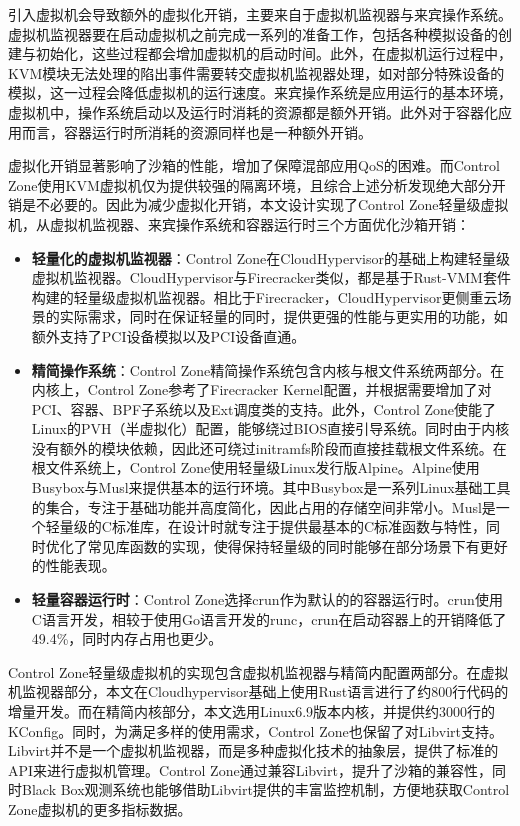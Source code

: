 引入虚拟机会导致额外的虚拟化开销，主要来自于虚拟机监视器与来宾操作系统。虚拟机监视器要在启动虚拟机之前完成一系列的准备工作，包括各种模拟设备的创建与初始化，这些过程都会增加虚拟机的启动时间。此外，在虚拟机运行过程中，KVM模块无法处理的陷出事件需要转交虚拟机监视器处理，如对部分特殊设备的模拟，这一过程会降低虚拟机的运行速度。来宾操作系统是应用运行的基本环境，虚拟机中，操作系统启动以及运行时消耗的资源都是额外开销。此外对于容器化应用而言，容器运行时所消耗的资源同样也是一种额外开销。

虚拟化开销显著影响了沙箱的性能，增加了保障混部应用QoS的困难。而Control Zone使用KVM虚拟机仅为提供较强的隔离环境，且综合上述分析发现绝大部分开销是不必要的。因此为减少虚拟化开销，本文设计实现了Control Zone轻量级虚拟机，从虚拟机监视器、来宾操作系统和容器运行时三个方面优化沙箱开销：

\begin{itemize}

    \item \textbf{轻量化的虚拟机监视器}：Control Zone在CloudHypervisor的基础上构建轻量级虚拟机监视器。CloudHypervisor与Firecracker类似，都是基于Rust-VMM套件构建的轻量级虚拟机监视器。相比于Firecracker，CloudHypervisor更侧重云场景的实际需求\citep{agache2020firecracker}，同时在保证轻量的同时，提供更强的性能与更实用的功能，如额外支持了PCI设备模拟以及PCI设备直通。

    \item \textbf{精简操作系统}：Control Zone精简操作系统包含内核与根文件系统两部分。在内核上，Control Zone参考了Firecracker Kernel配置，并根据需要增加了对PCI、容器、BPF子系统以及Ext调度类的支持。此外，Control Zone使能了Linux的PVH（半虚拟化）配置，能够绕过BIOS直接引导系统。同时由于内核没有额外的模块依赖，因此还可绕过initramfs阶段而直接挂载根文件系统。在根文件系统上，Control Zone使用轻量级Linux发行版Alpine\citep{alpine}。Alpine使用Busybox与Musl来提供基本的运行环境。其中Busybox是一系列Linux基础工具的集合，专注于基础功能并高度简化，因此占用的存储空间非常小。Musl是一个轻量级的C标准库，在设计时就专注于提供最基本的C标准函数与特性，同时优化了常见库函数的实现，使得保持轻量级的同时能够在部分场景下有更好的性能表现。

    \item \textbf{轻量容器运行时}：Control Zone选择crun\citep{crun}作为默认的的容器运行时。crun使用C语言开发，相较于使用Go语言开发的runc，crun在启动容器上的开销降低了49.4\%，同时内存占用也更少。

\end{itemize}

Control Zone轻量级虚拟机的实现包含虚拟机监视器与精简内配置两部分。在虚拟机监视器部分，本文在Cloudhypervisor基础上使用Rust语言进行了约800行代码的增量开发。而在精简内核部分，本文选用Linux6.9版本内核，并提供约3000行的KConfig。同时，为满足多样的使用需求，Control Zone也保留了对Libvirt支持。Libvirt并不是一个虚拟机监视器，而是多种虚拟化技术的抽象层，提供了标准的API来进行虚拟机管理。Control Zone通过兼容Libvirt，提升了沙箱的兼容性，同时Black Box观测系统也能够借助Libvirt提供的丰富监控机制，方便地获取Control Zone虚拟机的更多指标数据。

